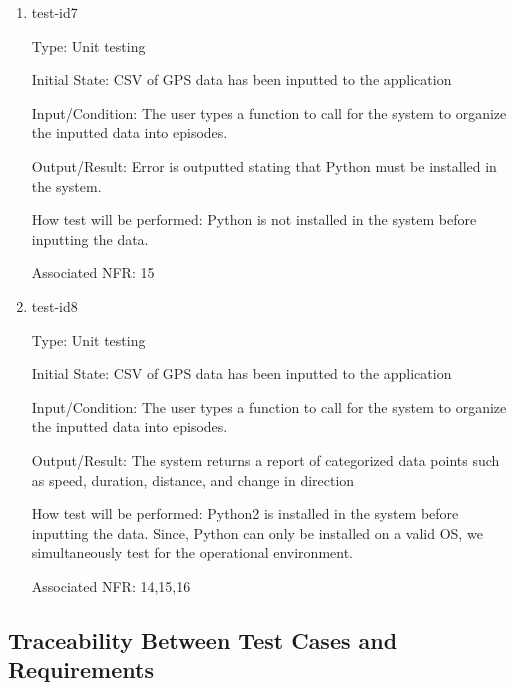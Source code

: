 \documentclass[12pt, titlepage]{article}
\begin{document}
\begin{enumerate}

\item{test-id7\\}

Type: Unit testing
					
Initial State: CSV of GPS data has been inputted to the application
					
Input/Condition: The user types a function to call for the system to organize the
inputted data into episodes. 
					
Output/Result: Error is outputted stating that Python must be installed in the system.
					
How test will be performed: Python is not installed in the system before inputting the data. 

Associated NFR: 15

\item{test-id8\\}

Type: Unit testing
					
Initial State: CSV of GPS data has been inputted to the application
					
Input/Condition: The user types a function to call for the system to organize the
inputted data into episodes. 
					
Output/Result: The system returns a report of categorized data points such
as speed, duration, distance, and change in direction
					
How test will be performed: Python2 is installed in the system before inputting the data. Since, Python can only be installed on a valid OS, we simultaneously test for the operational environment.

Associated NFR: 14,15,16

\end{enumerate}
\subsection{Traceability Between Test Cases and Requirements}
\end{document}
